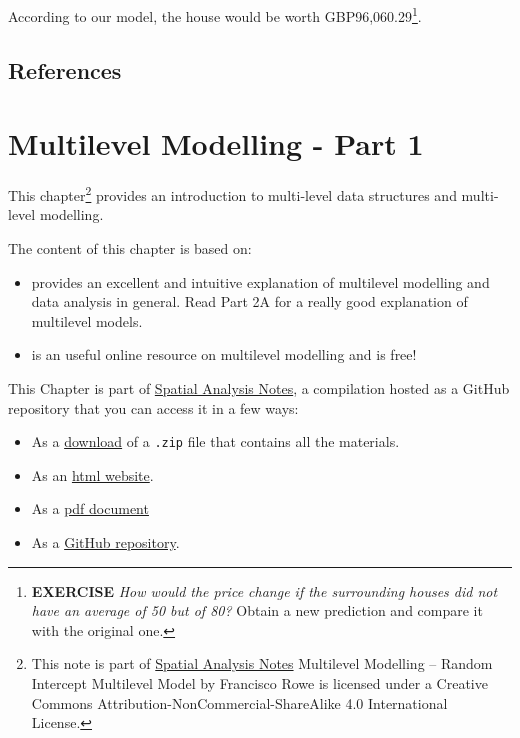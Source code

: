 \documentclass[
]{book}
\providecommand{\tightlist}{%
  \setlength{\itemsep}{0pt}\setlength{\parskip}{0pt}}
\begin{document}
According to our model, the house would be worth GBP96,060.29\footnote{\textbf{EXERCISE} \emph{How would the price change if the surrounding houses did not have an average of 50 but of 80?} Obtain a new prediction and compare it with the original one.}.

\hypertarget{references-1}{%
\section{References}\label{references-1}}

\hypertarget{multilevel-modelling---part-1}{%
\chapter{Multilevel Modelling - Part 1}\label{multilevel-modelling---part-1}}

This chapter\footnote{This note is part of \href{index.html}{Spatial Analysis Notes} {Multilevel Modelling -- Random Intercept Multilevel Model} by Francisco Rowe is licensed under a Creative Commons Attribution-NonCommercial-ShareAlike 4.0 International License.} provides an introduction to multi-level data structures and multi-level modelling.

The content of this chapter is based on:

\begin{itemize}
\item
  \citet{Gelman_Hill_2006_book} provides an excellent and intuitive explanation of multilevel modelling and data analysis in general. Read Part 2A for a really good explanation of multilevel models.
\item
  \citet{bristol2020} is an useful online resource on multilevel modelling and is free!
\end{itemize}

This Chapter is part of \href{index.html}{Spatial Analysis Notes}, a compilation hosted as a GitHub repository that you can access it in a few ways:

\begin{itemize}
\tightlist
\item
  As a \href{https://github.com/GDSL-UL/san/archive/master.zip}{download} of a \texttt{.zip} file that contains all the materials.
\item
  As an \href{https://gdsl-ul.github.io/san/multilevel-modelling-part-1.html}{html
  website}.
\item
  As a \href{https://gdsl-ul.github.io/san/spatial_analysis_notes.pdf}{pdf
  document}
\item
  As a \href{https://github.com/GDSL-UL/san}{GitHub repository}.
\end{itemize}
\end{document}
